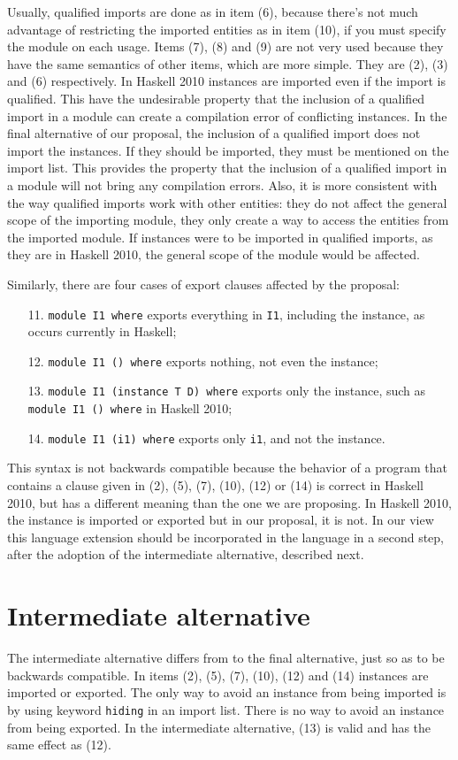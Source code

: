 \documentclass[msc]{ppgccufmg}
\begin{document}
Usually, qualified imports are done as in item (6), because there's not much advantage of restricting the imported entities as in item (10), if you must specify the module on each usage.
Items (7), (8) and (9) are not very used because they have the same semantics of other items, which are more simple.
They are (2), (3) and (6) respectively.
In Haskell 2010 instances are imported even if the import is qualified.
This have the undesirable property that the inclusion of a qualified import in a module can create a compilation error of conflicting instances.
In the final alternative of our proposal, the inclusion of a qualified import does not import the instances.
If they should be imported, they must be mentioned on the import list.
This provides the property that the inclusion of a qualified import in a module will not bring any compilation errors.
Also, it is more consistent with the way qualified imports work with other entities: they do not affect the general scope of the importing module, they only create a way to access the entities from the imported module.
If instances were to be imported in qualified imports, as they are in Haskell 2010, the general scope of the module would be affected.

Similarly, there are four cases of export clauses affected by the proposal:
\begin{enumerate}
\item[11.] \texttt{module I1 where} exports everything in \texttt{I1}, including the
instance, as occurs currently in Haskell;
\item[12.] \texttt{module I1 () where} exports nothing, not even the
  instance;
\item[13.] \texttt{module I1 (instance T D) where} exports only the
  instance, such as \texttt{module I1 () where} in Haskell 2010;
\item[14.] \texttt{module I1 (i1) where} exports only \texttt{i1}, and not the
instance.
\end{enumerate}

This syntax is not backwards compatible because the behavior of a program that
contains a clause given in (2), (5), (7), (10), (12) or (14) is correct in Haskell 2010, but has a
different meaning than the one we are proposing.  In Haskell 2010, the instance
is imported or exported but in our proposal, it is not.  In our view this language extension should
be incorporated in the language in a second step, after the adoption of the intermediate alternative, described next.

\section{Intermediate alternative}
The intermediate alternative differs from to the final alternative, just so as to be backwards compatible.  In items (2), (5), (7), (10), (12) and (14) instances are
imported or exported.  The only way to avoid an instance from being imported
is by using keyword \texttt{hiding} in an import list.  There is no way to
avoid an instance from being exported.  In the intermediate alternative, (13) is valid and has
the same effect as (12).
\end{document}
